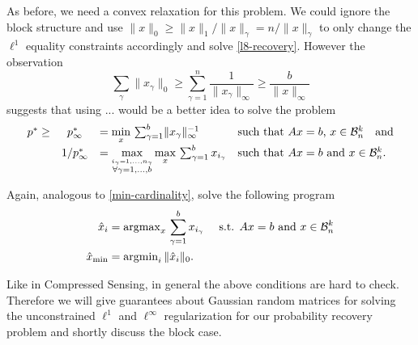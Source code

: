 \documentclass{article} %
\begin{document}
As before, we need a convex relaxation for this problem. We could ignore the block structure and use $\|x\|_0 \geq \|x\|_1/ \|x\|_{\gamma} = n/ \|x\|_{\gamma}$ to only change the $\ell^1$ equality constraints accordingly and solve \eqref{l8-recovery}. However the observation
\begin{equation*}
\sum_{\gamma}\|x_{\gamma}\|_0 \geq \sum_{\gamma=1}^n\frac{1}{\|x_{\gamma}\|_{\infty}} \geq \frac{b}{\|x\|_{\infty}}
\end{equation*}
suggests that using ... would be a better idea to solve the problem
\begin{equation}\label{block-l8-recovery}
  \begin{array}{rcllllr}
  p^* \geq& p_\infty^* &= \min\limits_x\, \sum_{\gamma = 1}^b\lVert x_{\gamma}\rVert_\infty^{-1}&\text{such that $Ax = b$, $x\in \mathcal B_n^k$}\quad \text{and}\\[5pt]
  &1/p_\infty^* &= \max\limits_{\overset{i_{\gamma} = 1, \dots, n_{\gamma}}{\forall \gamma = 1,\dots, b}} \max\limits_{x}\, \sum_{\gamma=1}^b x_{i_\gamma}&\text{such that $Ax = b$ and $x\in \mathcal B_n^k$.}
  \end{array}
\end{equation} 

Again,  analogous to \eqref{min-cardinality}, solve the following program
\begin{align}
\hat{x}_i &=  \operatorname{argmax}\limits_{x}\, \sum_{\gamma=1}^b x_{i_\gamma} \quad \text{ s.t. } Ax = b \text{ and } x\in \mathcal B_n^k \label{block-min-cardinality}\\
\hat{x}_{\min} &= \operatorname{argmin}\limits_{i} \|\hat{x}_i\|_0. \nonumber
\end{align}


Like in Compressed Sensing, in general the above conditions are hard to check. Therefore we will give guarantees about Gaussian random matrices for solving the unconstrained $\ell^1$ and $\ell^\infty$ regularization for our probability recovery problem and shortly discuss the block case.
\end{document}
